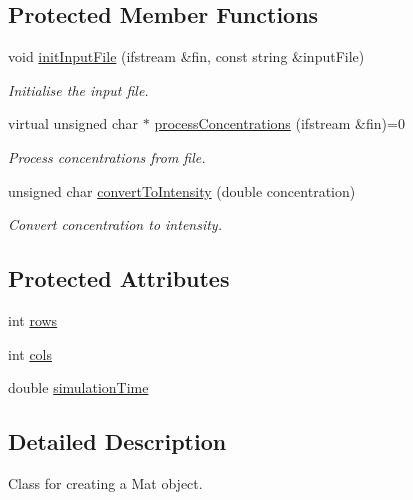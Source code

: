 \subsection*{Protected Member Functions}
\begin{DoxyCompactItemize}
\item 
void \hyperlink{classmultiscale_1_1analysis_1_1MatFactory_a7b54550119d9a44708dad9c1c4eefc7e}{init\-Input\-File} (ifstream \&fin, const string \&input\-File)
\begin{DoxyCompactList}\small\item\em Initialise the input file. \end{DoxyCompactList}\item 
virtual unsigned char $\ast$ \hyperlink{classmultiscale_1_1analysis_1_1MatFactory_a0493c87d7b74619a95f14c0e31a3e178}{process\-Concentrations} (ifstream \&fin)=0
\begin{DoxyCompactList}\small\item\em Process concentrations from file. \end{DoxyCompactList}\item 
unsigned char \hyperlink{classmultiscale_1_1analysis_1_1MatFactory_a015bb6710f3a832786d7291108323696}{convert\-To\-Intensity} (double concentration)
\begin{DoxyCompactList}\small\item\em Convert concentration to intensity. \end{DoxyCompactList}\end{DoxyCompactItemize}
\subsection*{Protected Attributes}
\begin{DoxyCompactItemize}
\item 
int \hyperlink{classmultiscale_1_1analysis_1_1MatFactory_a35672fb0c992f662018ee7c146794474}{rows}
\item 
int \hyperlink{classmultiscale_1_1analysis_1_1MatFactory_a9514356fe5226eaa31a4e61ca62a027c}{cols}
\item 
double \hyperlink{classmultiscale_1_1analysis_1_1MatFactory_a99caa620805ac50375699236d83fbd96}{simulation\-Time}
\end{DoxyCompactItemize}


\subsection{Detailed Description}
Class for creating a Mat object. 

